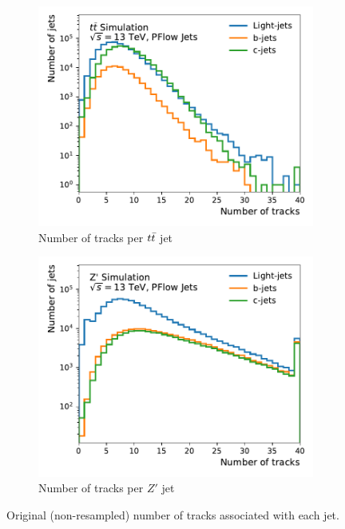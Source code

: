 \begin{figure}
    \centering
    \begin{subfigure}[b]{0.49\textwidth}
        \centering
        \includegraphics[width=\textwidth]{figures/flavour_tagging/ttbar_2.pdf}
        \caption{Number of tracks per $t\bar{t}$ jet}
        \label{fig:train_eta}
    \end{subfigure}
    \begin{subfigure}[b]{0.49\textwidth}
        \centering
        \includegraphics[width=\textwidth]{figures/flavour_tagging/zprime_2.pdf}
        \caption{Number of tracks per $Z'$ jet}
        \label{fig:train_pt}
    \end{subfigure}
    \caption{Original (non-resampled) number of tracks associated with each jet.}
    \label{fig:track_multiplicity}
\end{figure}


